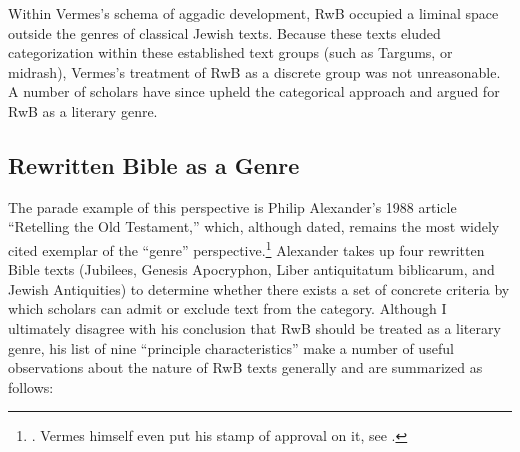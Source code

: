 Within Vermes's schema of aggadic development, RwB occupied a liminal
space outside the genres of classical Jewish texts. Because these texts
eluded categorization within these established text groups (such as
Targums, or midrash), Vermes's treatment of RwB as a discrete group was
not unreasonable. A number of scholars have since upheld the categorical
approach and argued for RwB as a literary genre.

\subsection{Rewritten Bible as a Genre}\label{rwb-as-a-genre}

The parade example of this perspective is Philip Alexander's 1988
article ``Retelling the Old Testament,'' which, although dated, remains
the most widely cited exemplar of the ``genre'' perspective.\footnote{\textcite{alexander_carson-williamson1988}.
  Vermes himself even put his stamp of approval on it, see
  \textcite[4]{vermes_zsengeller2014}.} Alexander takes up four
rewritten Bible texts (Jubilees, Genesis Apocryphon,
Liber antiquitatum biblicarum, and Jewish Antiquities) to determine
whether there exists a set of concrete criteria by which scholars can
admit or exclude text from the category. Although I ultimately disagree
with his conclusion that RwB should be treated as a literary genre, his
list of nine ``principle characteristics'' make a number of useful
observations about the nature of RwB texts generally and are summarized
as follows:

